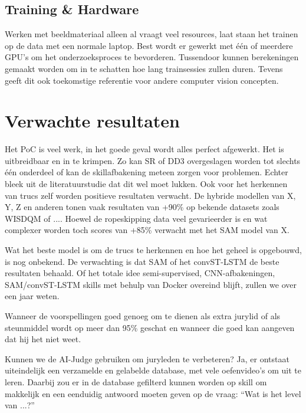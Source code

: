\subsection{Training \& Hardware}

Werken met beeldmateriaal alleen al vraagt veel resources, laat staan het trainen op de data met een normale laptop. Best wordt er gewerkt met één of meerdere GPU's om het onderzoeksproces te bevorderen. Tussendoor kunnen berekeningen gemaakt worden om in te schatten hoe lang trainsessies zullen duren. Tevens geeft dit ook toekomstige referentie voor andere computer vision concepten.


\section{Verwachte resultaten}
\label{sec:verwachte-resultaten}

    Het PoC is veel werk, in het goede geval wordt alles perfect afgewerkt. Het is uitbreidbaar en in te krimpen. Zo kan SR of DD3 overgeslagen worden tot slechts één onderdeel of kan de skillafbakening meteen zorgen voor problemen. Echter bleek uit de literatuurstudie dat dit wel moet lukken. Ook voor het herkennen van trucs zelf worden positieve resultaten verwacht. De hybride modellen van X, Y, Z en anderen tonen vaak resultaten van +90\% op bekende datasets zoals WISDQM of .... Hoewel de ropeskipping data veel gevarieerder is en wat complexer worden toch scores van +85\% verwacht met het SAM model van X.
    
    Wat het beste model is om de trucs te herkennen en hoe het geheel is opgebouwd, is nog onbekend. De verwachting is dat SAM of het convST-LSTM de beste resultaten behaald. Of het totale idee semi-supervised, CNN-afbakeningen, SAM/convST-LSTM skills met behulp van Docker overeind blijft, zullen we over een jaar weten.
    
    Wanneer de voorspellingen goed genoeg om te dienen als extra jurylid of als steunmiddel wordt op meer dan 95\% geschat en wanneer die goed kan aangeven dat hij het niet weet.
    
    Kunnen we de AI-Judge gebruiken om juryleden te verbeteren?
    Ja, er ontstaat uiteindelijk een verzamelde en gelabelde database, met vele oefenvideo's om uit te leren. Daarbij zou er in de database gefilterd kunnen worden op skill om makkelijk en een eenduidig antwoord moeten geven op de vraag: ``Wat is het level van ...?''
    
